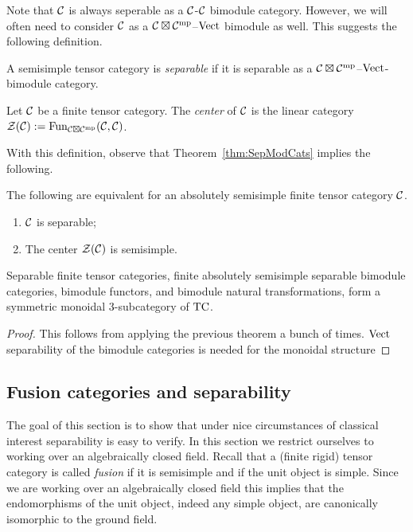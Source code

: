 \documentclass{amsart}
\begin{document}
Note that $\mathcal C$ is always seperable as a $\mathcal C$-$\mathcal C$ bimodule category.  However, we will often need to consider $\mathcal C$ as a $\mathcal C \boxtimes \mathcal C^{\mathrm{mp}}$--$\mathrm{Vect}$ bimodule as well.  This suggests the following definition.

\begin{definition}
	A semisimple tensor category is {\em separable} if it is separable as a $\mathcal C \boxtimes \mathcal C^{\mathrm{mp}}$--$\mathrm{Vect}$-bimodule category.  
\end{definition}


\begin{definition}
	Let $\mathcal C$ be a finite tensor category. The {\em center} of $\mathcal C$ is the linear category $\mathcal Z(\mathcal C) := \operatorname{Fun}_{\mathcal C \boxtimes \mathcal C^{\mathrm{mp}}}(\mathcal C, \mathcal C)$.
\end{definition}

With this definition, observe that Theorem~\ref{thm:SepModCats} implies the following.

\begin{corollary} \label{cor:Sep=semisimplecenter}
	The following are equivalent for an absolutely semisimple finite tensor category $\mathcal C$.
	\begin{enumerate}
		\item $\mathcal C$ is separable;
		\item The center $\mathcal Z(\mathcal C)$ is semisimple.
	\end{enumerate} 
\end{corollary}

\begin{theorem}
Separable finite tensor categories, finite absolutely semisimple separable bimodule categories, bimodule functors, and bimodule natural transformations, form a symmetric monoidal $3$-subcategory of $\mathrm{TC}$.
\end{theorem}
\begin{proof}
This follows from applying the previous theorem a bunch of times.  $\mathrm{Vect}$ separability of the bimodule categories is needed for the monoidal structure
\end{proof}


\subsection{Fusion categories and separability} \label{sec:tc-fusion}

The goal of this section is to show that under nice circumstances of classical interest  separability is easy to verify. In this section we restrict ourselves to working over an algebraically closed field. Recall that a (finite rigid) tensor category is called \emph{fusion} if it is semisimple and if the unit object is simple. Since we are working over an algebraically closed field this implies that the endomorphisms of the unit object, indeed any simple object, are canonically isomorphic to the ground field. 
\end{document}
